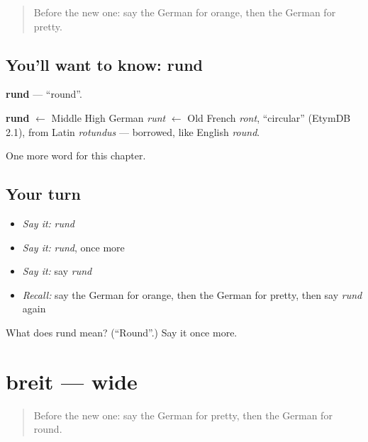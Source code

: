 \label{lesson:GE-C130-rund}



\begin{quote}
Before the new one: say the German for orange, then the German for pretty.
\end{quote}

\subsection*{You'll want to know: rund}
\textbf{rund} — \textquotedblleft{}round\textquotedblright{}.

\begin{cousinweb}
\textbf{rund} $\leftarrow$ Middle High German \emph{runt} $\leftarrow$ Old French \emph{ront}, \textquotedblleft{}circular\textquotedblright{} (EtymDB 2.1), from Latin \emph{rotundus} — borrowed, like English \emph{round}.
\end{cousinweb}

\begin{grammarlens}[title={What you've built}]
One more word for this chapter.
\end{grammarlens}

\subsection*{Your turn}
\begin{itemize}
\raggedright
  \item \emph{Say it:} \emph{rund}
  \item \emph{Say it:} \emph{rund}, once more
  \item \emph{Say it:} say \emph{rund}
  \item \emph{Recall:} say the German for orange, then the German for pretty, then say \emph{rund} again
\end{itemize}

\begin{tcolorbox}[breakable,colback=teal!4,colframe=teal!35!black,title={Before you move on}]
What does rund mean? (\textquotedblleft{}Round\textquotedblright{}.) Say it once more.
\end{tcolorbox}
\section[breit]{breit — wide}

\label{lesson:GE-C130-breit}



\begin{quote}
Before the new one: say the German for pretty, then the German for round.
\end{quote}

